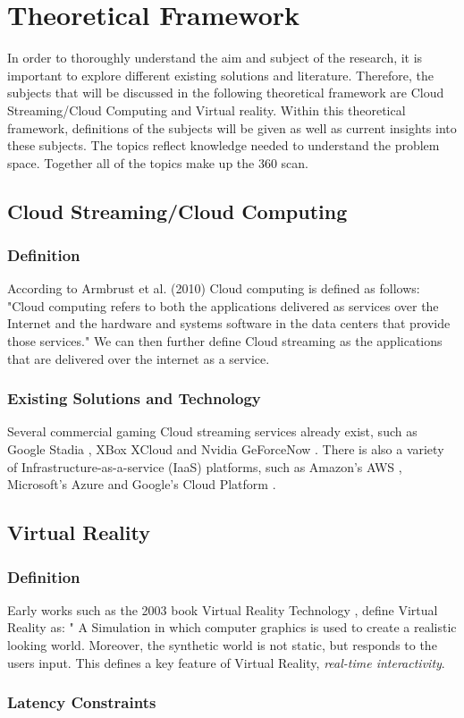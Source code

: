 \section{Theoretical Framework}

In order to thoroughly understand the aim and subject of the research, it is important to explore different existing solutions and literature. Therefore, the subjects that will be discussed in the  following theoretical framework are Cloud Streaming/Cloud Computing and Virtual reality. Within this theoretical framework, definitions of the subjects will be given as well as current insights into these subjects. The topics reflect knowledge needed to understand the problem space. Together all of the topics make up the 360 scan.

\subsection{Cloud Streaming/Cloud Computing}

\subsubsection{Definition}
According to Armbrust et al. (2010) Cloud computing is defined as follows: 
"Cloud computing refers to both the applications delivered as services over the Internet and the hardware and systems software in the data centers that provide those services." \parencite[]{aviewoncc}
We can then further define Cloud streaming as the applications that are delivered over the internet as a service.

\subsubsection{Existing Solutions and Technology}
Several commercial gaming Cloud streaming services already exist, such as Google Stadia \parencite{stadia}, XBox XCloud \parencite{xcloud} and Nvidia GeForceNow \parencite{geforcenow}. There is also a variety of Infrastructure\hyp{}as\hyp{}a\hyp{}service (IaaS) platforms, such as Amazon's AWS \parencite{aws}, Microsoft's Azure \parencite{azure} and Google's Cloud Platform \parencite{gcp}. 

\subsection{Virtual Reality}

\subsubsection{Definition}
Early works such as the 2003 book Virtual Reality Technology \cite{vrtech}, define Virtual Reality as: " A Simulation in which computer graphics is used to create a realistic looking world. Moreover, the synthetic world is not static, but responds to the users input. This defines a key feature of Virtual Reality, \textit{real\hyp{}time interactivity}.
\subsubsection{Latency Constraints}